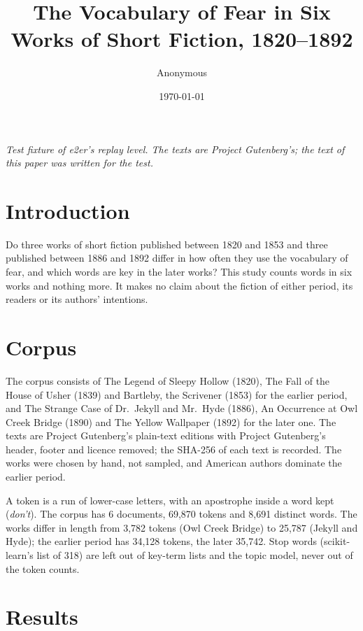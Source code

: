 \documentclass[11pt]{article}
\title{The Vocabulary of Fear in Six Works of Short Fiction, 1820--1892}
\author{Anonymous}
\date{\today}
\begin{document}
\maketitle

\begin{center}
\small \textit{Test fixture of e2er's replay level. The texts are Project Gutenberg's; the text of this paper was written for the test.}
\end{center}

\section{Introduction}

Do three works of short fiction published between 1820 and 1853 and three published between 1886 and 1892 differ in how often they use the vocabulary of fear, and which words are key in the later works? This study counts words in six works and nothing more. It makes no claim about the fiction of either period, its readers or its authors' intentions.

\section{Corpus}

The corpus consists of The Legend of Sleepy Hollow (1820), The Fall of the House of Usher (1839) and Bartleby, the Scrivener (1853) for the earlier period, and The Strange Case of Dr.~Jekyll and Mr.~Hyde (1886), An Occurrence at Owl Creek Bridge (1890) and The Yellow Wallpaper (1892) for the later one. The texts are Project Gutenberg's plain-text editions with Project Gutenberg's header, footer and licence removed; the SHA-256 of each text is recorded. The works were chosen by hand, not sampled, and American authors dominate the earlier period.

A token is a run of lower-case letters, with an apostrophe inside a word kept (\textit{don't}). The corpus has 6 documents, 69,870 tokens and 8,691 distinct words. The works differ in length from 3,782 tokens (Owl Creek Bridge) to 25,787 (Jekyll and Hyde); the earlier period has 34,128 tokens, the later 35,742. Stop words (scikit-learn's list of 318) are left out of key-term lists and the topic model, never out of the token counts.

\section{Results}
\end{document}
